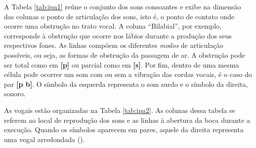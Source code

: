 A Tabela \ref{tab:ipa1} reúne o conjunto dos sons consoantes e exibe na dimensão das colunas o ponto de articulação dos sons, isto é, o ponto de contato onde ocorre uma obstrução no trato vocal. A coluna “Bilabial”, por exemplo, corresponde à obstrução que ocorre nos lábios durante a produção dos seus respectivos fones. As linhas compõem os diferentes \textit{modos} de articulação possíveis, ou seja, as formas de obstrução da passagem de ar. A obstrução pode ser total como em \textbf{[p]} ou parcial como em \textbf{[s]}. Por fim, dentro de uma mesma célula pode ocorrer um som com ou sem a vibração das cordas vocais, é o caso do par \textbf{[p b]}. O símbolo da esquerda representa o som surdo e o símbolo da direita, sonoro. 

As vogais estão organizadas na Tabela \ref{tab:ipa2}. As colunas dessa tabela se referem ao local de reprodução dos sons e as linhas à abertura da boca durante a execução. Quando os símbolos aparecem em pares, aquele da direita representa uma vogal arredondada (\cite{paraconhecer:2015}).  
